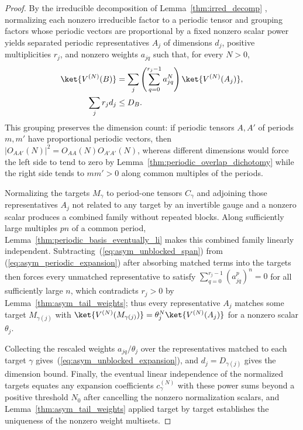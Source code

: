 \begin{proof}
    \leanok
    By the irreducible decomposition of Lemma~\ref{thm:irred_decomp}
    \cite{DeLasCuevas2017Irreducible}, normalizing each nonzero irreducible
    factor to a periodic tensor and grouping factors whose periodic vectors
    are proportional by a fixed nonzero scalar power yields separated periodic
    representatives $A_j$ of dimensions $d_j$, positive multiplicities
    $r_j$, and nonzero weights $a_{jq}$ such that, for every $N>0$,
    \begin{align}
        \ket{V^{(N)}(B)}
                      & =\sum_j\left(\sum_{q=0}^{r_j-1}a_{jq}^{N}\right)
        \ket{V^{(N)}(A_j)}, \label{eq:asym_periodic_expansion}           \\
        \sum_j r_jd_j & \leq D_B.
    \end{align}
    This grouping preserves the dimension count: if periodic tensors
    $A,A'$ of periods $m,m'$ have proportional periodic vectors, then
    $|O_{AA'}(N)|^2=O_{AA}(N)O_{A'A'}(N)$, whereas different dimensions would
    force the left side to tend to zero by
    Lemma~\ref{thm:periodic_overlap_dichotomy} while the right side tends to
    $mm'>0$ along common multiples of the periods.

    Normalizing the targets $M_\gamma$ to period-one tensors $C_\gamma$ and
    adjoining those representatives $A_j$ not related to any target by an
    invertible gauge and a nonzero scalar produces a combined family without
    repeated blocks. Along sufficiently large multiples $pn$ of a common
    period, Lemma~\ref{thm:periodic_basis_eventually_li} makes this combined
    family linearly independent. Subtracting~(\ref{eq:asym_unblocked_span})
    from (\ref{eq:asym_periodic_expansion}) after absorbing matched terms into
    the targets then forces every unmatched representative to satisfy
    $\sum_{q=0}^{r_j-1}(a_{jq}^{p})^n=0$ for all sufficiently large $n$, which
    contradicts $r_j>0$ by Lemma~\ref{thm:asym_tail_weights}; thus every
    representative $A_j$ matches some target $M_{\gamma(j)}$ with
    $\ket{V^{(N)}(M_{\gamma(j)})}=\theta_j^N\ket{V^{(N)}(A_j)}$ for a nonzero
    scalar $\theta_j$.

    Collecting the rescaled weights $a_{jq}/\theta_j$ over the representatives
    matched to each target $\gamma$ gives~(\ref{eq:asym_unblocked_expansion}),
    and $d_j=D_{\gamma(j)}$ gives the dimension bound. Finally, the eventual
    linear independence of the normalized targets equates any expansion
    coefficients $c_\gamma^{(N)}$ with these power sums beyond a positive
    threshold $N_0$ after cancelling the nonzero normalization scalars, and
    Lemma~\ref{thm:asym_tail_weights} applied target by target establishes
    the uniqueness of the nonzero weight multisets.
\end{proof}

